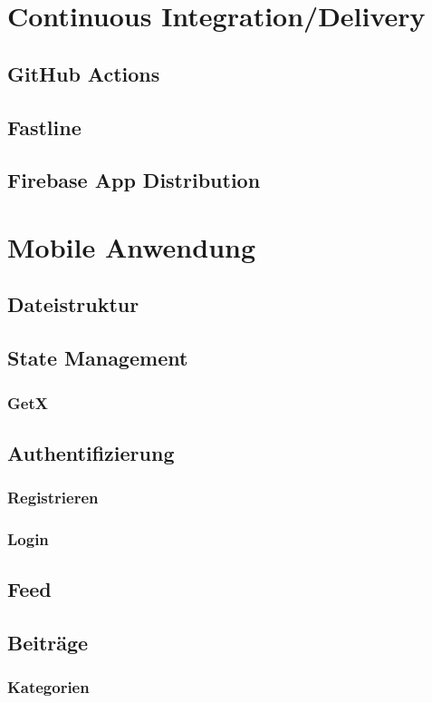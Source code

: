 \section{Continuous Integration/Delivery}
\subsection{GitHub Actions}
\subsection{Fastline}
\subsection{Firebase App Distribution}

\section{Mobile Anwendung}
\subsection{Dateistruktur}
\subsection{State Management}
\subsubsection{GetX}

\subsection{Authentifizierung}
\subsubsection{Registrieren}
\subsubsection{Login}

\subsection{Feed}
\subsection{Beiträge}
\subsubsection{Kategorien}

